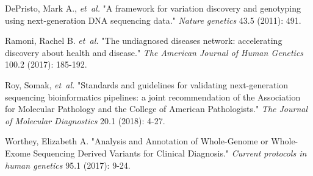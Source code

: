 \documentclass{bioinfo}
\begin{document}
\begin{thebibliography}{}


 DePristo, Mark A., \textit{et~al.} "A framework for variation discovery and genotyping using next-generation DNA sequencing data." {\it Nature genetics} 43.5 (2011): 491.

 Ramoni, Rachel B. \textit{et~al.} "The undiagnosed diseases network: accelerating discovery about health and disease." {\it The American Journal of Human Genetics} 100.2 (2017): 185-192.

%
 Roy, Somak, \textit{et~al.} "Standards and guidelines for validating next-generation sequencing bioinformatics pipelines: a joint recommendation of the Association for Molecular Pathology and the College of American Pathologists." {\it The Journal of Molecular Diagnostics} 20.1 (2018): 4-27.

 Worthey, Elizabeth A. "Analysis and Annotation of Whole-Genome or Whole-Exome Sequencing Derived Variants for Clinical Diagnosis." {\it Current protocols in human genetics} 95.1 (2017): 9-24.

\end{thebibliography}
\end{document}

